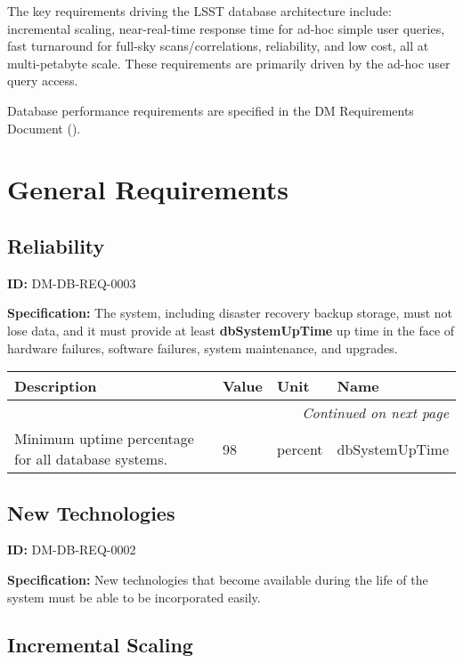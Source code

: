 \documentclass[DM,toc]{lsstdoc}
\date{2017-06-29}
\makeatletter
\newcommand{\paramname}[1]{\hspace{0pt}#1}
\newcommand{\unitname}[1]{\hspace{0pt}#1}
\newenvironment{parameters}[0]{%
\setlength\LTleft{0pt}
\setlength\LTright{\fill}
\begin{small}
\begin{longtable}[]{|p{0.49\textwidth}|l|p{0.6in}|p{1.70in}@{}|}

\hline \textbf{Description} & \textbf{Value} & \textbf{Unit} & \textbf{Name} \\ \hline
\endhead

\hline \multicolumn{4}{r}{\emph{Continued on next page}} \\
\endfoot

\hline\hline
\endlastfoot
}{%
\hline
\end{longtable}
\end{small}
}
\makeatother
\begin{document}
\maketitle

The key requirements driving the LSST database architecture include: incremental scaling, near-real-time response time for ad-hoc simple user queries, fast turnaround for full-sky scans/correlations, reliability, and low cost, all at multi-petabyte scale. These requirements are primarily driven by the ad-hoc user query access.

Database performance requirements are specified in the DM Requirements Document ().

\section{General Requirements}

\subsection{Reliability}

\label{DM-DB-REQ-0003}
\textbf{ID:} DM-DB-REQ-0003

\textbf{Specification:}
The system, including disaster recovery backup storage, must not lose data, and it must provide at least \textbf{dbSystemUpTime} up time in the face of hardware failures, software failures, system maintenance, and upgrades.

\begin{parameters}
Minimum uptime percentage for all database systems.
&
98
&
\unitname{%
percent
}
&
\paramname{%
dbSystemUpTime
} \\\hline
\end{parameters}

\subsection{New Technologies}

\label{DM-DB-REQ-0002}
\textbf{ID:} DM-DB-REQ-0002

\textbf{Specification:}
New technologies that become available during the life of the system must be able to be incorporated easily.

\subsection{Incremental Scaling}
\end{document}
